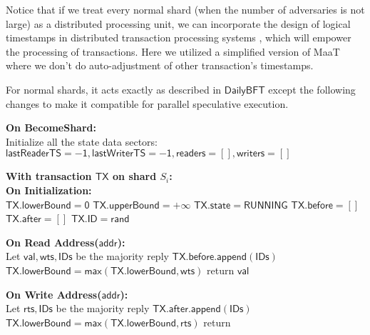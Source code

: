 Notice that if we treat every normal shard (when the number of adversaries is not large) as a distributed processing unit, we can incorporate the design of
logical timestamps \cite{yu2016tictoc} in distributed transaction processing systems \cite{mahmoud2014maat}, which will empower the processing of transactions.
Here we utilized a simplified version of MaaT where we don't do auto-adjustment of other transaction's timestamps.

For normal shards, it acts exactly as described in $\mathsf{DailyBFT}$ except the following changes to make it compatible for parallel speculative execution.

\begin{figure*}
\begin{algorithm}[H]
\textbf{On BecomeShard:}\\
\myin Initialize all the state data sectors: $\mathsf{lastReaderTS = -1, lastWriterTS = -1, readers=[], writers=[]}$

\textbf{With transaction $\mathsf{TX}$ on shard $S_i$:\\
On Initialization:}\\
\hspace{0.1in} $\mathsf{TX.lowerBound = 0}$\;
\hspace{0.1in} $\mathsf{TX.upperBound = +\infty}$\;
\hspace{0.1in} $\mathsf{TX.state = RUNNING}$\;
\hspace{0.1in} $\mathsf{TX.before = []}$\;
\hspace{0.1in} $\mathsf{TX.after = []}$\;
\hspace{0.1in} $\mathsf{TX.ID = rand}$\;

\textbf{On Read Address($\mathsf{addr}$):}\\
Let $\mathsf{val, wts, IDs}$ be the majority reply\;
$\mathsf{TX.before.append(IDs)}$\;
$\mathsf{TX.lowerBound= max(TX.lowerBound, wts)}$\;
return $\mathsf{val}$\;

\textbf{On Write Address($\mathsf{addr}$):}\\
Let $\mathsf{rts, IDs}$ be the majority reply\;
$\mathsf{TX.after.append(IDs)}$
$\mathsf{TX.lowerBound= max(TX.lowerBound, rts)}$\;
return\;


\end{algorithm}
\end{figure*}
